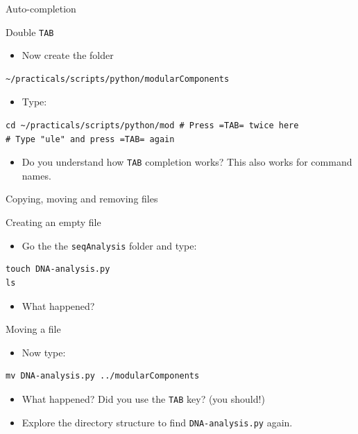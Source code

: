 \documentclass[big]{beamer}
\begin{document}
\begin{frame}[fragile,label=sec-2-22]{Auto-completion}
 \begin{block}{Double \texttt{TAB}}
\begin{itemize}
\item Now create the folder
\end{itemize}
\begin{verbatim}
~/practicals/scripts/python/modularComponents
\end{verbatim}
\begin{itemize}
\item Type:
\end{itemize}
\begin{verbatim}
cd ~/practicals/scripts/python/mod # Press =TAB= twice here
# Type "ule" and press =TAB= again
\end{verbatim}
\begin{itemize}
\item Do you understand how \texttt{TAB} completion works? This also works for command
names.
\end{itemize}
\end{block}
\end{frame}
\begin{frame}[fragile,label=sec-2-23]{Copying, moving and removing files}
 \begin{block}{Creating an empty file}
\begin{itemize}
\item Go the the \texttt{seqAnalysis} folder and type:
\end{itemize}
\begin{verbatim}
touch DNA-analysis.py
ls
\end{verbatim}
\begin{itemize}
\item What happened?
\end{itemize}
\end{block}
\begin{block}{Moving a file}
\begin{itemize}
\item Now type:
\end{itemize}
\begin{verbatim}
mv DNA-analysis.py ../modularComponents
\end{verbatim}
\begin{itemize}
\item What happened? Did you use the \texttt{TAB} key? (you should!)
\item Explore the directory structure to find \texttt{DNA-analysis.py} again.
\end{itemize}
\end{block}
\end{frame}
\end{document}
